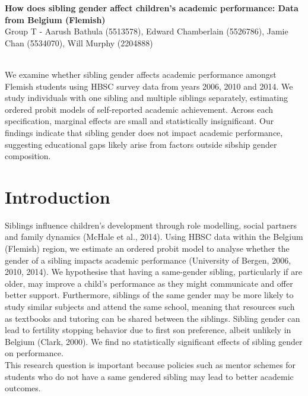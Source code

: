 \documentclass[12pt]{article}
\begin{document}
 
\begin{center}
    \begin{large}
        \textbf{How does sibling gender affect children’s academic performance: Data from Belgium (Flemish)} 
        \\Group T - Aarush Bathula (5513578), Edward Chamberlain (5526786), Jamie Chan (5534070), Will Murphy (2204888)
    \end{large} \\
    
We examine whether sibling gender affects academic performance amongst Flemish students using HBSC survey data from years 2006, 2010 and 2014. We study individuals with one sibling and multiple siblings separately, estimating ordered probit models of self-reported academic achievement. Across each specification, marginal effects are small and statistically insignificant. Our findings indicate that sibling gender does not impact academic performance, suggesting educational gaps likely arise from factors outside sibship gender composition.
\end{center}

\section{Introduction}
Siblings influence children's development through role modelling, social partners and family dynamics (McHale et al., 2014). Using HBSC data within the Belgium (Flemish) region, we estimate an ordered probit model to analyse whether the gender of a sibling impacts academic performance (University of Bergen, 2006, 2010, 2014). We hypothesise that having a same-gender sibling, particularly if are older, may improve a child's performance as they might communicate and offer better support. Furthermore, siblings of the same gender may be more likely to study similar subjects and attend the same school, meaning that resources such as textbooks and tutoring can be shared between the siblings. Sibling gender can lead to fertility stopping behavior due to first son preference, albeit unlikely in Belgium (Clark, 2000). We find no statistically significant effects of sibling gender on performance. \\

This research question is important because policies such as mentor schemes for students who do not have a same gendered sibling may lead to better academic outcomes.
\end{document}
